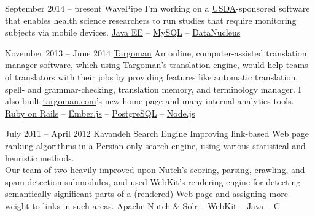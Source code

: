 \documentclass{tccv}
\newcommand{\plus}{\raisebox{.1\height}{\scalebox{.8}{+}}}
\begin{document}
\begin{project_list}

\vspace{8pt}

\item{September 2014 -- present}
     {}
     {\vspace{-14pt}WavePipe}
	 {I'm working on a \href{http://usda.gov}{USDA}-sponsored software that enables health science researchers to run studies that require monitoring subjects via mobile devices.}
     {%
     	\href{http://www.oracle.com/technetwork/java/javaee/overview/index.html}{Java EE} -- %
	\href{http://www.mysql.com}{MySQL} -- %
	\href{http://www.datanucleus.org}{DataNucleus}%
	}



\item{November 2013 -- June 2014}
     {}
     {\vspace{-14pt}\href{https://github.com/pooriaazimi/targoman}{Targoman}}
	 {An online, computer-assisted \mbox{translation} manager software, which using \href{http://targoman.com/smt.php}{Targoman}'s translation engine, would help teams of translators with their jobs by providing features like auto\-matic translation, spell- and grammar-checking, translation memory, and terminology manager.
	 I also built \href{https://targoman.com}{targoman.com}'s new home page and many internal analytics tools.
	 }
     {%
     	\href{http://rubyonrails.org}{Ruby on Rails} -- %
	\href{http://emberjs.com}{Ember.js} -- %
	\href{http://www.postgresql.org}{PostgreSQL} -- %
	\href{http://nodejs.org}{Node.js}%
	}
		
	
\vspace{-6pt}

\item{July 2011 -- April 2012}
     {}
     {Kavandeh Search Engine}
	 {Improving link-based Web page ranking algorithms in a Persian-only search engine, using various statistical and heuristic methods.
	 \\[1.5pt]
	 Our team of two heavily improved upon Nutch's \mbox{scoring}, parsing, crawling, and spam detection submodules, and used WebKit's rendering engine for detecting \mbox{semantically} significant parts of a (rendered) Web page and \mbox{assigning} more weight to links in such areas.}
     {%
     	Apache \href{http://nutch.apache.org}{Nutch} \&
		\href{http://lucene.apache.org/solr/}{Solr} -- %
		\href{http://www.webkit.org}{WebKit} -- %
		\href{http://www.oracle.com/technetwork/java/}{Java} -- %
		\href{https://en.wikipedia.org/wiki/C\%2B\%2B}{C\plus\plus}%
	}


\end{project_list}
\end{document}
